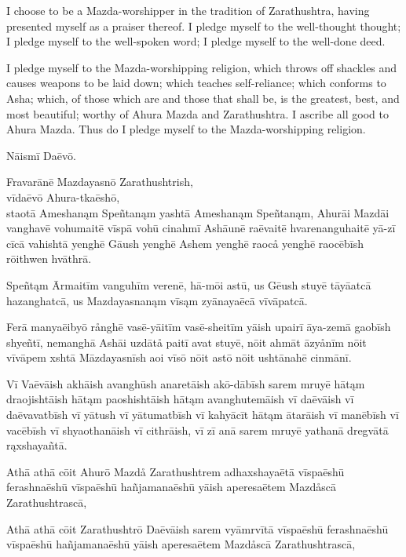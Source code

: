 \documentclass{book}
\begin{document}
\begin{pages}
\begin{Leftside}
I choose to be a Mazda-worshipper in the tradition of Zarathushtra, having presented myself as a praiser thereof. I pledge myself to the well-thought thought; I pledge myself to the well-spoken word; I pledge myself to the well-done deed.

I pledge myself to the Mazda-worshipping religion, which throws off shackles and causes weapons to be laid down; which teaches self-reliance; which conforms to Asha; which, of those which are and those that shall be, is the greatest, best, and most beautiful; worthy of Ahura Mazda and Zarathushtra. I ascribe all good to Ahura Mazda. Thus do I pledge myself to the Mazda-worshipping religion.

\endnumbering
\end{Leftside}

\begin{Rightside}
\beginnumbering

\pstart
{}
\pend

\pstart
\centerline{Nāismī Daēvō.}
\pend

\numberpstarttrue
\autopar

Fravarānē Mazdayasnō Zarathushtrish,\\
vīdaēvō Ahura-tkaēshō,\\
staotā Ameshanąm Speñtanąm yashtā Ameshanąm Speñtanąm, Ahurāi Mazdāi vanghavē vohumaitē vīspā vohū cinahmī Ashāunē raēvaitē hvarenanguhaitē yā-zī cīcā vahishtā yenghē Gāush yenghē Ashem yenghē raocå yenghē raocēbīsh rōithwen hvāthrā.

Speñtąm Ārmaitīm vanguhīm verenē, hā-mōi astū, us Gēush stuyē tāyāatcā hazanghatcā, us Mazdayasnanąm vīsąm zyānayaēcā vīvāpatcā.

Ferā manyaēibyō rånghē vasē-yāitīm vasē-sheitīm yāish upairī āya-zemā gaobīsh shyeñtī, nemanghā Ashāi uzdātå paitī avat stuyē, nōit ahmāt āzyånīm nōit vīvāpem xshtā Māzdayasnīsh aoi vīsō nōit astō nōit ushtānahē cinmānī. 

Vī Vaēvāish akhāish avanghūsh anaretāish akō-dābīsh sarem mruyē hātąm draojishtāish hātąm paoshishtāish hātąm avanghutemāish vī daēvāish vī daēvavatbīsh vī yātush vī yātumatbīsh vī kahyācīt hātąm ātarāish vī manēbīsh vī vacēbīsh vī shyaothanāish vī cithrāish, vī zī anā sarem mruyē yathanā dregvātā rąxshayañtā. 

Athā athā cōit Ahurō Mazdå Zarathushtrem adhaxshayaētā vīspaēshū ferashnaēshū vīspaēshū hañjamanaēshū yāish aperesaētem Mazdåscā Zarathushtrascā, 

Athā athā cōit Zarathushtrō Daēvāish sarem vyāmrvītā vīspaēshū ferashnaēshū vīspaēshū hañjamanaēshū yāish aperesaētem Mazdåscā Zarathushtrascā,


\end{Rightside}
\end{pages}
\end{document}
